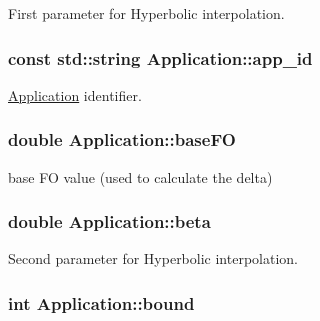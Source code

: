 First parameter for Hyperbolic interpolation. 

\hypertarget{classApplication_a5cedee59cfd3cbf89d02174e2f521493}{
\subsubsection[{app\-\_\-id}]{\setlength{\rightskip}{0pt plus 5cm}const std\-::string Application\-::app\-\_\-id\hspace{0.3cm}{\ttfamily [private]}}}\label{classApplication_a5cedee59cfd3cbf89d02174e2f521493}


\hyperlink{classApplication}{Application} identifier. 

\hypertarget{classApplication_aa703e7525d446d98b5cd51c959d35998}{
\subsubsection[{base\-F\-O}]{\setlength{\rightskip}{0pt plus 5cm}double Application\-::base\-F\-O\hspace{0.3cm}{\ttfamily [private]}}}\label{classApplication_aa703e7525d446d98b5cd51c959d35998}


base F\-O value (used to calculate the delta) 

\hypertarget{classApplication_a356ffae49ae223b3d98b57e56210e3a9}{
\subsubsection[{beta}]{\setlength{\rightskip}{0pt plus 5cm}double Application\-::beta\hspace{0.3cm}{\ttfamily [private]}}}\label{classApplication_a356ffae49ae223b3d98b57e56210e3a9}


Second parameter for Hyperbolic interpolation. 

\hypertarget{classApplication_a6e91bef9d503af0e8ba38c8f445c8cb0}{
\subsubsection[{bound}]{\setlength{\rightskip}{0pt plus 5cm}int Application\-::bound\hspace{0.3cm}{\ttfamily [private]}}}\label{classApplication_a6e91bef9d503af0e8ba38c8f445c8cb0}


